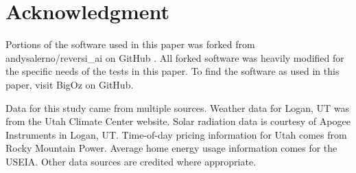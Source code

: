 \documentclass[conference]{IEEEtran}
\begin{document}
\section*{Acknowledgment}

Portions of the software used in this paper was forked from andysalerno/reversi\_ai on GitHub \cite{noauthor_winning_2016}. All forked software was heavily modified for the specific needs of the tests in this paper. To find the software as used in this paper, visit BigOz on GitHub.

Data for this study came from multiple sources. Weather data for Logan, UT was from the Utah Climate Center website. Solar radiation data is courtesy of Apogee Instruments in Logan, UT. Time-of-day pricing information for Utah comes from Rocky Mountain Power. Average home energy usage information comes for the USEIA. Other data sources are credited where appropriate.


\begin{small}

\end{small}
\end{document}
